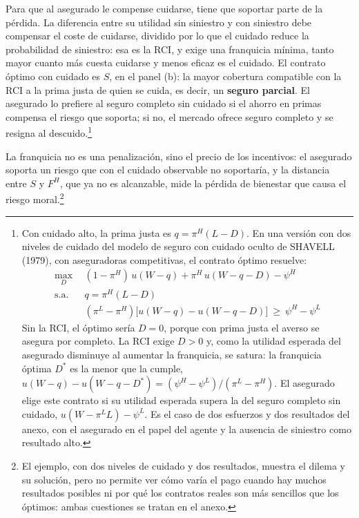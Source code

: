 \documentclass[10pt,a4paper]{article}
\newcounter{anexo}
\begin{document}
Para que al asegurado le compense cuidarse, tiene que soportar parte de la pérdida. La diferencia entre su utilidad sin siniestro y con siniestro debe compensar el coste de cuidarse, dividido por lo que el cuidado reduce la probabilidad de siniestro: esa es la RCI, y exige una franquicia mínima, tanto mayor cuanto más cuesta cuidarse y menos eficaz es el cuidado. El contrato óptimo con cuidado es $S$, en el panel (b): la mayor cobertura compatible con la RCI a la prima justa de quien se cuida, es decir, un \textbf{seguro parcial}. El asegurado lo prefiere al seguro completo sin cuidado si el ahorro en primas compensa el riesgo que soporta; si no, el mercado ofrece seguro completo y se resigna al descuido.\footnote{%
    Con cuidado alto, la prima justa es $q=\pi^H(L-D)$. En una versión con dos niveles de cuidado del modelo de seguro con cuidado oculto de SHAVELL (1979), con aseguradoras competitivas, el contrato óptimo resuelve:
    $$\begin{aligned}
    \max_{D}\ \ &(1-\pi^H)\,u(W-q)+\pi^H\,u(W-q-D)-\psi^H\\
    \text{s.a.}\ \ &q=\pi^H(L-D)\\
    &(\pi^L-\pi^H)\big[u(W-q)-u(W-q-D)\big]\ \ge\ \psi^H-\psi^L
    \end{aligned}$$
    Sin la RCI, el óptimo sería $D=0$, porque con prima justa el averso se asegura por completo. La RCI exige $D>0$ y, como la utilidad esperada del asegurado disminuye al aumentar la franquicia, se satura: la franquicia óptima $D^{*}$ es la menor que la cumple, $u(W-q)-u(W-q-D^{*})=(\psi^H-\psi^L)/(\pi^L-\pi^H)$. El asegurado elige este contrato si su utilidad esperada supera la del seguro completo sin cuidado, $u(W-\pi^L L)-\psi^L$. Es el caso de dos esfuerzos y dos resultados del anexo, con el asegurado en el papel del agente y la ausencia de siniestro como resultado alto.
}


La franquicia no es una penalización, sino el precio de los incentivos: el asegurado soporta un riesgo que con el cuidado observable no soportaría, y la distancia entre $S$ y $F^H$, que ya no es alcanzable, mide la pérdida de bienestar que causa el riesgo moral.\footnote{%
  El ejemplo, con dos niveles de cuidado y dos resultados, muestra el dilema y su solución, pero no permite ver cómo varía el pago cuando hay muchos resultados posibles ni por qué los contratos reales son más sencillos que los óptimos: ambas cuestiones se tratan en el anexo.
}
\end{document}
